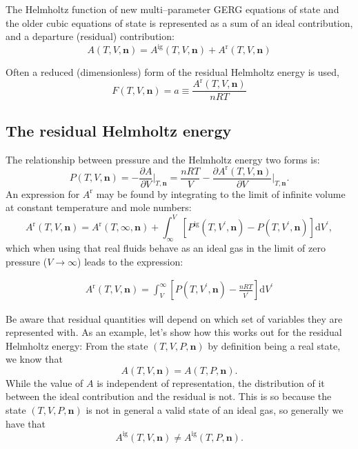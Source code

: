 \documentclass[internal,english]{sintefmemo2012}
\newcommand{\pone}[3]{\frac{\partial #1}{\partial #2}\bigg|_{#3}}%
\newcommand*{\vektor}[1]{\boldsymbol{#1}}%
\newcommand{\dd}[1]{\mathrm{d}{#1}}
\begin{document}
The Helmholtz function of new multi--parameter GERG equations of state
\cite{kunz07,span96} and the older cubic equations of state is represented as a sum of 
an ideal contribution, and a departure (residual) contribution:
\begin{equation}
\label{eq:helmholtz}
A(T,V,\vektor{n}) = A^{\text{ig}}(T,V,\vektor{n}) + A^{\text{r}}(T,V,\vektor{n})
\end{equation}

Often a reduced (dimensionless) form of the residual Helmholtz energy is used,
\begin{equation}
\label{eq:reduced_helmholtz}
F(T,V,\vektor{n}) = a \equiv  \frac{A^\text{r}(T,V,\vektor{n})}{nRT}
\end{equation}

\subsection{The residual Helmholtz energy}

The relationship between pressure and the Helmholtz energy two forms is:
\begin{equation}
  P(T,V,\vektor{n}) = -\pone{A}{V}{T,\vektor{n}} 
  = \frac{nRT}{V} - \pone{A^{\text{r}}(T,V,\vektor{n})}{V}{T,\vektor{n}}.
  \label{}
\end{equation}
An expression for $A^\text{r}$ may be found by integrating to the limit of infinite volume at constant temperature and mole numbers:
\begin{equation}
  A^\text{r}(T,V,\vektor{n}) 
  = A^\text{r}(T,\infty,\vektor{n}) + \int_\infty^V \left[ P^\text{ig}(T,V^\prime,\vektor{n}) - P(T,V^\prime,\vektor{n}) \right]\dd{V^\prime},
  \label{}
\end{equation}
which when using that real fluids behave as an ideal gas in the limit of zero pressure ($V \to \infty$) leads to the expression:
\begin{framed}
\begin{align}
  A^\text{r}(T,V,\vektor{n}) 
  = \int^\infty_V \left[ P(T,V^\prime,\vektor{n}) - \frac{nRT}{V^\prime} \right]\dd{V^\prime}
  \label{eq:helmholtz_int}
\end{align}
\end{framed}

Be aware that residual quantities will depend on which set of variables they are represented with. As an example, let's show 
how this works out for the residual Helmholtz energy:
From the state $(T,V,P,\vektor{n})$ by definition being a real state, we know that 
\begin{equation}
  A(T,V,\vektor{n}) = A(T,P,\vektor{n}).
  \label{eq:Aequal}
\end{equation}
While the value of $A$ is independent of representation, the distribution of it between the ideal 
contribution and the residual is not. This is so because  
the state $(T,V,P,\vektor{n})$ is not in 
general a valid state of an ideal gas, so 
generally we have that
\begin{equation}
  A^\text{ig}(T,V,\vektor{n}) \neq A^\text{ig}(T,P,\vektor{n}).
  \label{}
\end{equation}
\end{document}
